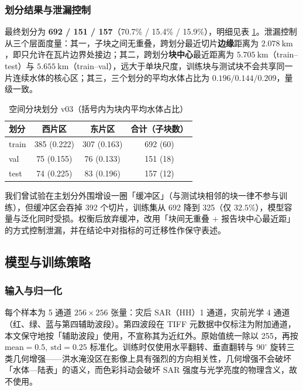 \subsubsection{划分结果与泄漏控制}

最终划分为 \textbf{692 / 151 / 157}（70.7\% / 15.4\% / 15.9\%），明细见表 \ref{tab:q1-split}。泄漏控制从三个层面度量：其一，子块之间无重叠，跨划分最近切片\textbf{边缘}距离为 $2.078\ \mathrm{km}$，即只允许在瓦片边界处接边；其二，跨划分\textbf{块中心}最近距离为 $5.705\ \mathrm{km}$（train--test）与 $5.655\ \mathrm{km}$（train--val），远大于单块尺度，训练块与测试块不会共享同一片连续水体的核心区；其三，三个划分的平均水体占比为 $0.196/0.144/0.209$，量级一致。

\begin{table}[H]
\centering
\caption{空间分块划分 v03（括号内为块内平均水体占比）}
\label{tab:q1-split}
\begin{tabular}{lccc}
\toprule
划分 & 西片区 & 东片区 & 合计（子块数） \\
\midrule
train & 385 (0.222) & 307 (0.163) & 692 (60) \\
val   & 75 (0.155)  & 76 (0.133)  & 151 (18) \\
test  & 74 (0.225)  & 83 (0.196)  & 157 (12) \\
\bottomrule
\end{tabular}
\end{table}

我们曾试验在主划分外围增设一圈「缓冲区」（与测试块相邻的块一律不参与训练），但缓冲区会吞掉 392 个切片，训练集从 692 降到 325（仅 $32.5\%$），模型容量与泛化同时受损。权衡后放弃缓冲，改用「块间无重叠 + 报告块中心最近距」的方式控制泄漏，并在结论中对指标的可迁移性作保守表述。

\subsection{模型与训练策略}
\label{sec:q1-model}

\subsubsection{输入与归一化}

每个样本为 5 通道 $256\times256$ 张量：灾后 SAR（HH）1 通道，灾前光学 4 通道（红、绿、蓝与第四辅助波段）。第四波段在 TIFF 元数据中仅标注为附加通道，本文保守地按「辅助波段」使用，不宣称其为近红外。原始值统一除以 255，再按 $\text{mean}=0.5,\ \text{std}=0.25$ 标准化。训练时仅使用水平翻转、垂直翻转与 $90^\circ$ 旋转三类几何增强——洪水淹没区在影像上具有强烈的方向相关性，几何增强不会破坏「水体—陆表」的语义，而色彩抖动会破坏 SAR 强度与光学亮度的物理含义，故不使用。

